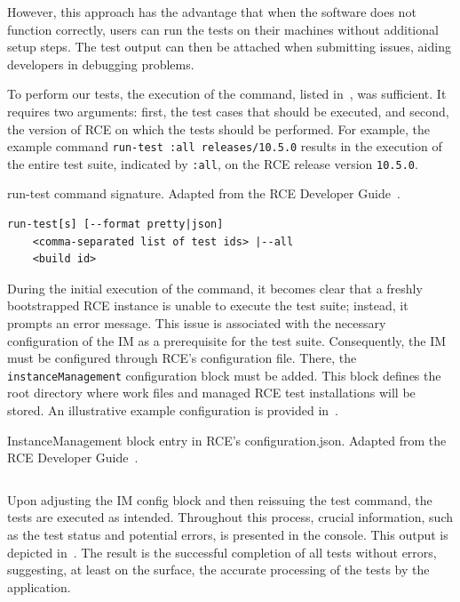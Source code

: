 However, this approach has the advantage that when the software does not function correctly, users can run the tests on their machines without additional setup steps. The test output can then be attached when submitting issues, aiding developers in debugging problems.

To perform our tests, the execution of the command, listed in~, was sufficient. It requires two arguments: first, the test cases that should be executed, and second, the version of \ac{RCE} on which the tests should be performed. For example, the example command \texttt{run-test :all releases/10.5.0} results in the execution of the entire test suite, indicated by \texttt{:all}, on the \ac{RCE} release version \texttt{10.5.0}.

\begin{listing}[ht]
\caption{run-test command signature. Adapted from the RCE Developer Guide~\cite{rceDevGuide10x}.}
\label{lst:run-tests-command}
\begin{verbatim}
run-test[s] [--format pretty|json] 
    <comma-separated list of test ids> |--all
    <build id>
\end{verbatim}
\end{listing}

During the initial execution of the command, it becomes clear that a freshly bootstrapped \ac{RCE} instance is unable to execute the test suite; instead, it prompts an error message. This issue is associated with the necessary configuration of the \ac{IM} as a prerequisite for the test suite. Consequently, the \ac{IM} must be configured through \ac{RCE}'s configuration file. There, the \texttt{instanceManagement} configuration block must be added. This block defines the root directory where work files and managed RCE test installations will be stored. An illustrative example configuration is provided in~.

\begin{listing}[!ht]
\caption{InstanceManagement block entry in \ac{RCE}'s configuration.json. Adapted from the RCE Developer Guide~\cite{rceDevGuide10x}.}
\label{lst:configuration-json}
\inputminted[linenos, xleftmargin=2em]{json}{files/code/configuration.json}
\end{listing}

Upon adjusting the \ac{IM} config block and then reissuing the test command, the tests are executed as intended. Throughout this process, crucial information, such as the test status and potential errors, is presented in the console. This output is depicted in~. The result is the successful completion of all tests without errors, suggesting, at least on the surface, the accurate processing of the tests by the application.

